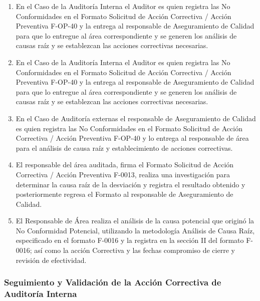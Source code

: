\begin{enumerate}
	\item En el Caso de la Auditoría Interna el Auditor es quien registra las No Conformidades en el Formato Solicitud de Acción Correctiva / Acción Preventiva F-OP-40 y la entrega al responsable de Aseguramiento de Calidad para que lo entregue al área correspondiente y se generen los análisis de causas raíz y se establezcan las acciones correctivas necesarias.
	\item En el Caso de la Auditoría Interna el Auditor es quien registra las No Conformidades en el Formato Solicitud de Acción Correctiva / Acción Preventiva F-OP-40 y la entrega al responsable de Aseguramiento de Calidad para que lo entregue al área correspondiente y se generen los análisis de causas raíz y se establezcan las acciones correctivas necesarias.
	\item En el Caso de Auditoría externas el responsable de Aseguramiento de Calidad es quien registra las No Conformidades en el Formato Solicitud de Acción Correctiva / Acción Preventiva F-OP-40 y lo entrega al responsable de área para el análisis de causa raíz y establecimiento de acciones correctivas.
	\item El responsable del área auditada, firma el Formato Solicitud de Acción Correctiva / Acción Preventiva F-0013, realiza una investigación para determinar la causa raíz de la desviación y registra el resultado obtenido y posteriormente regresa el Formato al responsable de Aseguramiento de Calidad.
	\item El Responsable de Área realiza el análisis de la causa potencial que originó la No Conformidad Potencial, utilizando la metodología Análisis de Causa Raíz, especificado en el formato F-0016 y la registra en la sección II del formato F-0016; así como la acción Correctiva y las fechas compromiso de cierre y revisión de efectividad.
\end{enumerate}

\subsubsection{Seguimiento y Validación de la Acción Correctiva de Auditoría Interna}

